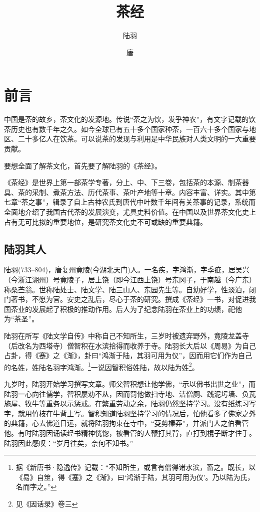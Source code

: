 \documentclass[12pt,UTF8]{ctexbook}
\title{\heiti\zihao{0} 茶经}
\author{陆羽}
\date{唐}
\begin{document}
\maketitle
\tableofcontents

\frontmatter

\chapter{前言}

中国是茶的故乡，茶文化的发源地。传说“茶之为饮，发乎神农”，有文字记载的饮茶历史也有数千年之久。如今全球已有五十多个国家种茶，一百六十多个国家与地区、二十多亿人在饮茶。可以说茶的发现与利用是中华民族对人类文明的一大重要贡献。

要想全面了解茶文化，首先要了解陆羽的《茶经》。

《茶经》是世界上第一部茶学专著，分上、中、下三卷，包括茶的本源、制茶器具、茶的采制、煮茶方法、历代茶事、茶叶产地等十章。内容丰富、详实。其中第七章“茶之事”，辑录了自上古神农氏到唐代中叶数千年间有关茶事的记录，系统而全面地介绍了我国古代茶的发展演变，尤具史料价值。在中国以及世界茶文化史上占有无可比拟的重要地位，是研究茶文化史不可或缺的重要典籍。

\section{陆羽其人}

陆羽(733--804)，唐复州竟陵(今湖北天门)人。一名疾，字鸿渐，字季疵，居吴兴（今浙江湖州）号竟陵子，居上饶（即今江西上饶）号东冈子，于南越（今广东）称桑苎翁。世称陆处士、陆文学、陆三山人、东园先生等。自幼好学，性淡泊，闭门著书，不愿为官。安史之乱后，尽心于茶的研究。撰成《茶经》一书，对促进我国茶业的发展起了积极的推动作用。后人为了纪念陆羽在茶业上的功绩，祀他为“茶圣”。

陆羽在所写《陆文学自传》中称自己不知所生，三岁时被遗弃野外，竟陵龙盖寺（后改名为西塔寺）僧智积在水滨拾得而收养于寺。陆羽长大后以《周易》为自己占卦，得《蹇》之《渐》，卦曰“鸿渐于陆，其羽可用为仪”，因而用它们作为自己的名姓，姓陆名羽字鸿渐。\footnote{据《新唐书·隐逸传》记载：“不知所生，或言有僧得诸水滨，畜之。既长，以《易》自筮，得《蹇》之《渐》，曰‘鸿渐于陆，其羽可用为仪’。乃以陆为氏，名而字之。”}一说因智积俗姓陆，故以陆为姓\footnote{见《因话录》卷三}。

九岁时，陆羽开始学习撰写文章。师父智积想让他学佛，“示以佛书出世之业”，而陆羽一心向往儒学，智积屡劝不从，因而罚他做扫寺地、洁僧厕、践泥圬墙、负瓦施屋、牧牛等重务以示惩戒。在繁重劳动之余，陆羽仍然坚持学习。没有纸练习写字，就用竹枝在牛背上写。智积知道陆羽坚持学习的情况后，怕他看多了佛家之外的典籍，心去佛道日远，就将陆羽拘束在寺中，“芟剪榛莽”，并派门人之伯看管他。有时陆羽因诵读经书精神恍惚，被看管的人鞭打其背，直打到棍子断才住手。陆羽因此感叹：“岁月往矣，奈何不知书。”
\end{document}
